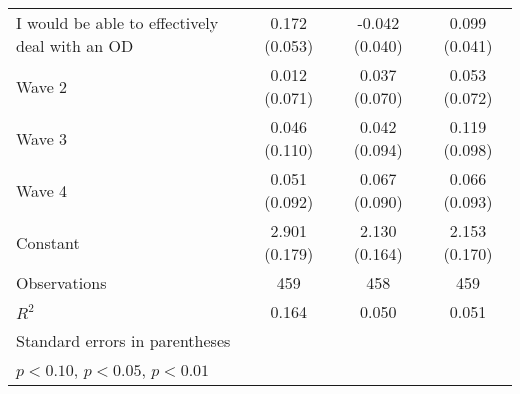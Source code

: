 \begin{table}[htbp]
\begin{tabular}{l*{3}{c}}
I would be able to effectively deal with an OD&0.172\sym{***} (0.053)         &-0.042 (0.040)         &0.099\sym{**} (0.041)         \\
Wave 2          &0.012 (0.071)         &0.037 (0.070)         &0.053 (0.072)         \\
Wave 3          &0.046 (0.110)         &0.042 (0.094)         &0.119 (0.098)         \\
Wave 4          &0.051 (0.092)         &0.067 (0.090)         &0.066 (0.093)         \\
Constant        &2.901\sym{***} (0.179)         &2.130\sym{***} (0.164)         &2.153\sym{***} (0.170)         \\
\midrule
Observations    &      459         &      458         &      459         \\
\(R^{2}\)       &    0.164         &    0.050         &    0.051         \\
\bottomrule
\multicolumn{4}{l}{\footnotesize Standard errors in parentheses}\\
\multicolumn{4}{l}{\footnotesize \sym{*} \(p<0.10\), \sym{**} \(p<0.05\), \sym{***} \(p<0.01\)}\\
\end{tabular}
\end{table}
